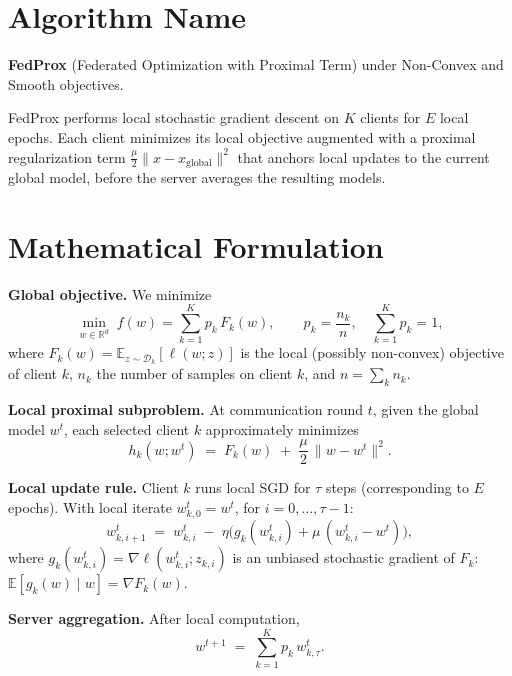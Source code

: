 \documentclass{article}
\begin{document}
\section*{Algorithm Name}
\textbf{FedProx} (Federated Optimization with Proximal Term) under Non-Convex and Smooth objectives.

FedProx performs local stochastic gradient descent on $K$ clients for $E$ local epochs. Each client minimizes its local objective augmented with a proximal regularization term $\frac{\mu}{2}\|x - x_{\text{global}}\|^2$ that anchors local updates to the current global model, before the server averages the resulting models.

\section*{Mathematical Formulation}

\textbf{Global objective.} We minimize
\begin{equation}
\min_{w \in \mathbb{R}^d} \; f(w) = \sum_{k=1}^{K} p_k \, F_k(w),
\qquad p_k = \frac{n_k}{n}, \quad \sum_{k=1}^K p_k = 1,
\end{equation}
where $F_k(w) = \mathbb{E}_{z \sim \mathcal{D}_k}[\ell(w; z)]$ is the local (possibly non-convex) objective of client $k$, $n_k$ the number of samples on client $k$, and $n = \sum_k n_k$.

\textbf{Local proximal subproblem.} At communication round $t$, given the global model $w^t$, each selected client $k$ approximately minimizes
\begin{equation}
h_k(w; w^t) \;=\; F_k(w) \;+\; \frac{\mu}{2}\, \|w - w^t\|^2 .
\end{equation}

\textbf{Local update rule.} Client $k$ runs local SGD for $\tau$ steps (corresponding to $E$ epochs). With local iterate $w_{k,0}^t = w^t$, for $i = 0,\dots,\tau-1$:
\begin{equation}
w_{k,i+1}^{t} \;=\; w_{k,i}^{t} \;-\; \eta \Big( g_k(w_{k,i}^t) + \mu \,(w_{k,i}^t - w^t) \Big),
\end{equation}
where $g_k(w_{k,i}^t) = \nabla \ell(w_{k,i}^t; z_{k,i})$ is an unbiased stochastic gradient of $F_k$:
$\mathbb{E}[g_k(w) \mid w] = \nabla F_k(w)$.

\textbf{Server aggregation.} After local computation,
\begin{equation}
w^{t+1} \;=\; \sum_{k=1}^{K} p_k \, w_{k,\tau}^{t}.
\end{equation}
\end{document}

